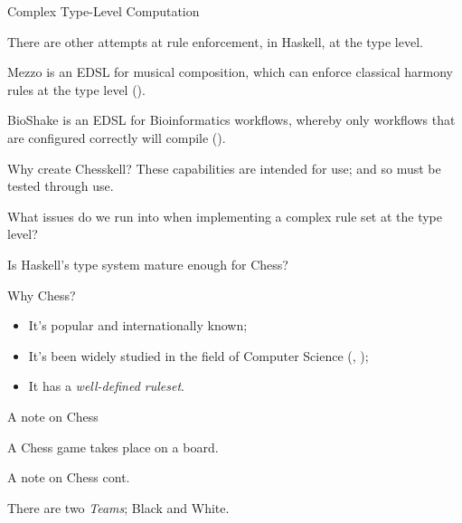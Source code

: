 \documentclass{beamer}
\begin{document}
\begin{frame}{Complex Type-Level Computation}

There are other attempts at rule enforcement, in Haskell, at the type level.

\pause

Mezzo is an EDSL for musical composition, which can enforce classical harmony rules at the type level (\cite{mezzohaskellsymposium}).

\pause

BioShake is an EDSL for Bioinformatics workflows, whereby only workflows that are configured correctly will compile (\cite{bioshake}).
    
\end{frame}

\begin{frame}[fragile]{Why create Chesskell?}
These capabilities are intended for use; and so must be tested through use.

What issues do we run into when implementing a complex rule set at the type level?

\pause

Is Haskell's type system mature enough for Chess?
\end{frame}

\begin{frame}{Why Chess?}

\begin{itemize}
    \item<1-3> It's popular and internationally known;
    \item<2-3> It's been widely studied in the field of Computer Science (\cite{chesseducation}, \cite{chessml});
    \item<3-4> It has a \emph{well-defined ruleset}.
\end{itemize}
    
\end{frame}

\begin{frame}{A note on Chess}

A Chess game takes place on a board.

\begin{figure}[h]
    \centering
    \showboard
    \label{emptyboard}
\end{figure}

\end{frame}

\begin{frame}{A note on Chess cont.}

There are two \emph{Teams}; Black and White.

\begin{figure}[h]
    \centering
    \newgame
    \showboard
    \label{startboard1}
\end{figure}

\end{frame}
\end{document}
